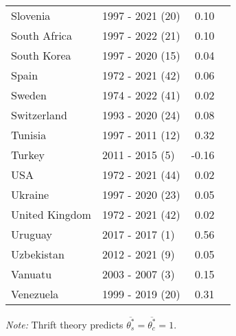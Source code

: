 \begin{table}[H]
{{\begin{tabular}{llrr}
Slovenia & 1997 - 2021 (20) & 0.10\\
South Africa & 1997 - 2022 (21) & 0.10\\
South Korea & 1997 - 2020 (15) & 0.04\\
Spain & 1972 - 2021 (42) & 0.06\\
\addlinespace
Sweden & 1974 - 2022 (41) & 0.02\\
Switzerland & 1993 - 2020 (24) & 0.08\\
Tunisia & 1997 - 2011 (12) & 0.32\\
Turkey & 2011 - 2015 (5) & -0.16\\
USA & 1972 - 2021 (44) & 0.02\\
\addlinespace
Ukraine & 1997 - 2020 (23) & 0.05\\
United Kingdom & 1972 - 2021 (42) & 0.02\\
Uruguay & 2017 - 2017 (1) & 0.56\\
Uzbekistan & 2012 - 2021 (9) & 0.05\\
Vanuatu & 2003 - 2007 (3) & 0.15\\
\addlinespace
Venezuela & 1999 - 2019 (20) & 0.31\\
\bottomrule
\end{tabular}

}

}


\label{tbl-indicator_table}
\begin{flushleft}
\footnotesize \emph{Note:} Thrift theory predicts \(\overline{\theta_s^*} = \overline{\theta_c^*} = 1\).
\end{flushleft}
\end{table}